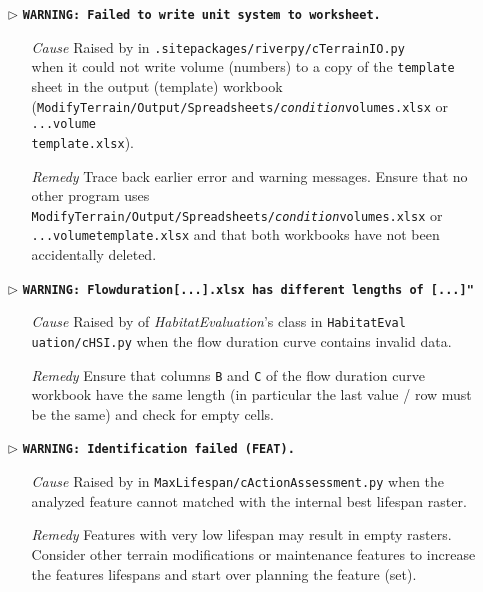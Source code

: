 \begin{itemize}
	\item[$\triangleright$]\textbf{\texttt{WARNING: Failed to write unit system to worksheet.}}
	\begin{itemize}
		\item[\textit{Cause}\hspace{0.27cm}] Raised by  in \texttt{.site{\myUnderscore}packages/riverpy/cTerrainIO.py}\\when it could not write volume (numbers) to a copy of the \texttt{template} sheet in the output (template) workbook (\texttt{ModifyTerrain/Output/Spreadsheets/\textit{condition}{\myUnderscore}volumes.xlsx} or \texttt{...volume{\myUnderscore}}\\ \texttt{template.xlsx}).
		\item[\textit{Remedy}] Trace back earlier error and warning messages. Ensure that no other program uses \texttt{ModifyTerrain/Output/Spreadsheets/\textit{condition}{\myUnderscore}volumes.xlsx} or \texttt{...volume{\myUnderscore}template.xlsx} and that both workbooks have not been accidentally deleted.\\
	\end{itemize}	
	
	\item[$\triangleright$]\textbf{\texttt{WARNING: Flow{\myUnderscore}duration[...].xlsx has different lengths of [...]"}}
	\begin{itemize}
		\item[\textit{Cause}\hspace{0.27cm}] Raised by  of \textit{HabitatEvaluation}'s  class in \texttt{HabitatEval uation/cHSI.py} when the flow duration curve contains invalid data.
		\item[\textit{Remedy}] Ensure that columns \texttt{B} and \texttt{C} of the flow duration curve workbook have the same length (in particular the last value / row must be the same) and check for empty cells.\\
	\end{itemize}
	
	\item[$\triangleright$]\textbf{\texttt{WARNING: Identification failed (FEAT).}}
	\begin{itemize}
		\item[\textit{Cause}\hspace{0.27cm}] Raised by  in \texttt{MaxLifespan/cActionAssessment.py} when the analyzed feature cannot matched with the internal best lifespan raster.
		\item[\textit{Remedy}] Features with very low lifespan may result in empty rasters. Consider other terrain modifications or maintenance features to increase the features lifespans and start over planning the feature (set).\\
	\end{itemize}
	

\end{itemize}
